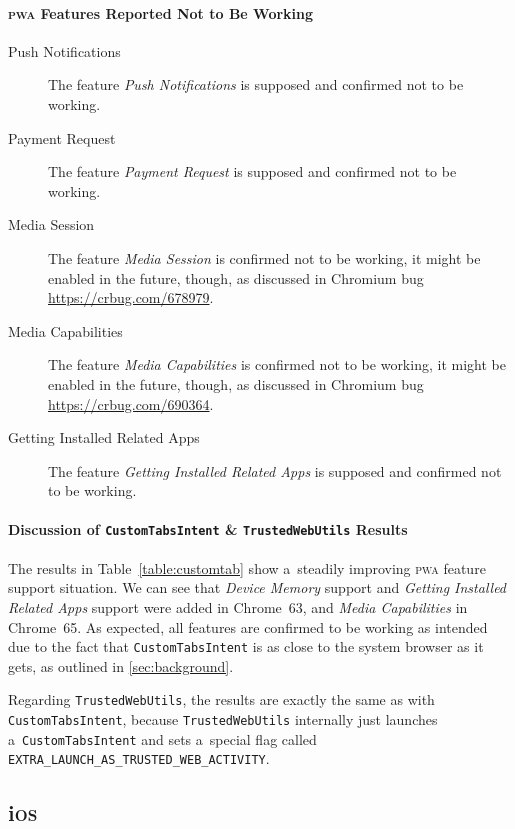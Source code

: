 \documentclass[sigconf,hyphens]{acmart}
\begin{document}
\paragraph{\textsc{pwa} Features Reported Not to Be Working}

\begin{description}
  \item[Push Notifications] The feature \emph{Push Notifications} is supposed and confirmed not to be working.
  \item[Payment Request] The feature \emph{Payment Request} is supposed and confirmed not to be working.
  \item[Media Session] The feature \emph{Media Session} is confirmed not to be working,
    it might be enabled in the future, though, as discussed in Chromium bug
    \url{https://crbug.com/678979}.
  \item[Media Capabilities] The feature \emph{Media Capabilities} is confirmed not to be working,
    it might be enabled in the future, though, as discussed in Chromium bug
    \url{https://crbug.com/690364}.
  \item[Getting Installed Related Apps] The feature \emph{Getting Installed Related Apps}
    is supposed and confirmed not to be working.
\end{description} 

\paragraph{\textbf{Discussion of \texttt{CustomTabsIntent} \& \texttt{TrustedWebUtils} Results}}

The results in Table~\ref{table:customtab} show
a~steadily improving \textsc{pwa} feature support situation. 
We can see that \emph{Device Memory} support and \emph{Getting Installed Related Apps} support
were added in Chrome~63, and \emph{Media Capabilities} in Chrome~65.
As expected, all features are confirmed to be working as intended
due to the fact that \texttt{CustomTabsIntent} is as close to the system browser as it gets,
as outlined in \autoref{sec:background}.

Regarding \texttt{TrustedWebUtils},
the results are exactly the same as with \texttt{CustomTabsIntent},
because \texttt{TrustedWebUtils} internally just launches a~\texttt{CustomTabsIntent}
and sets a~special flag called \texttt{EXTRA\_LAUNCH\_AS\_TRUSTED\_WEB\_ACTIVITY}.

\subsection{i\textsc{os}}
\end{document}
